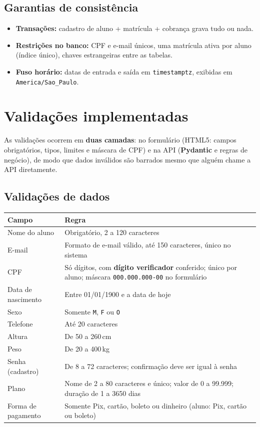 \documentclass[11pt,a4paper,final]{article}
\newcommand{\cod}[1]{\texttt{#1}}
\begin{document}
\subsection{Garantias de consistência}

\begin{itemize}
  \item \textbf{Transações:} cadastro de aluno + matrícula + cobrança grava tudo ou nada.
  \item \textbf{Restrições no banco:} CPF e e-mail únicos, uma matrícula ativa por aluno (índice único),
        chaves estrangeiras entre as tabelas.
  \item \textbf{Fuso horário:} datas de entrada e saída em \cod{timestamptz}, exibidas em
        \cod{America/Sao\_Paulo}.
\end{itemize}

\section{Validações implementadas}\label{sec:validacoes}

As validações ocorrem em \textbf{duas camadas}: no formulário (HTML5: campos obrigatórios, tipos, limites e
máscara de CPF) e na API (\textbf{Pydantic} e regras de negócio), de modo que dados inválidos são barrados
mesmo que alguém chame a API diretamente.

\subsection{Validações de dados}

\begin{xltabular}{\textwidth}{l Y}
  \toprule
  \textbf{Campo} & \textbf{Regra} \\
  \midrule
  \endhead
  Nome do aluno         & Obrigatório, 2 a 120 caracteres \\
  E-mail                & Formato de e-mail válido, até 150 caracteres, único no sistema \\
  CPF                   & Só dígitos, com \textbf{dígito verificador} conferido; único por aluno; máscara \cod{000.000.000-00} no formulário \\
  Data de nascimento    & Entre 01/01/1900 e a data de hoje \\
  Sexo                  & Somente \cod{M}, \cod{F} ou \cod{O} \\
  Telefone              & Até 20 caracteres \\
  Altura                & De 50 a 260\,cm \\
  Peso                  & De 20 a 400\,kg \\
  Senha (cadastro)      & De 8 a 72 caracteres; confirmação deve ser igual à senha \\
  Plano                 & Nome de 2 a 80 caracteres e único; valor de 0 a 99.999; duração de 1 a 3650 dias \\
  Forma de pagamento    & Somente Pix, cartão, boleto ou dinheiro (aluno: Pix, cartão ou boleto) \\
  \bottomrule
\end{xltabular}
\end{document}

